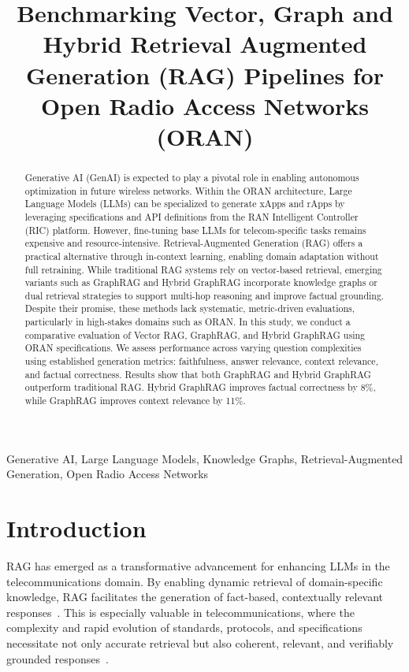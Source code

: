 \documentclass[10pt, conference]{IEEEtran}
\begin{document}
\title{Benchmarking Vector, Graph and Hybrid Retrieval Augmented Generation (RAG) Pipelines for Open Radio Access Networks (ORAN)}

\author{
}

\maketitle


\begin{abstract}
Generative AI (GenAI) is expected to play a pivotal role in enabling autonomous optimization in future wireless networks. Within the ORAN architecture, Large Language Models (LLMs) can be specialized to generate xApps and rApps by leveraging specifications and API definitions from the RAN Intelligent Controller (RIC) platform. However, fine-tuning base LLMs for telecom-specific tasks remains expensive and resource-intensive. Retrieval-Augmented Generation (RAG) offers a practical alternative through in-context learning, enabling domain adaptation without full retraining. While traditional RAG systems rely on vector-based retrieval, emerging variants such as GraphRAG and Hybrid GraphRAG incorporate knowledge graphs or dual retrieval strategies to support multi-hop reasoning and improve factual grounding. Despite their promise, these methods lack systematic, metric-driven evaluations, particularly in high-stakes domains such as ORAN. In this study, we conduct a comparative evaluation of Vector RAG, GraphRAG, and Hybrid GraphRAG using ORAN specifications. We assess performance across varying question complexities using established generation metrics: faithfulness, answer relevance, context relevance, and factual correctness. Results show that both GraphRAG and Hybrid GraphRAG outperform traditional RAG. Hybrid GraphRAG improves factual correctness by 8\%, while GraphRAG improves context relevance by 11\%.
\end{abstract}

\begin{IEEEkeywords}
Generative AI, Large Language Models, Knowledge Graphs,
Retrieval-Augmented Generation, Open Radio Access Networks
\end{IEEEkeywords}

\section{Introduction}
RAG has emerged as a transformative advancement for enhancing LLMs in the telecommunications domain. By enabling dynamic retrieval of domain-specific knowledge, RAG facilitates the generation of fact-based, contextually relevant responses~\cite{yilma2025telecomrag}. This is especially valuable in telecommunications, where the complexity and rapid evolution of standards, protocols, and specifications necessitate not only accurate retrieval but also coherent, relevant, and verifiably grounded responses~\cite{bornea2024telco}. 
\end{document}
